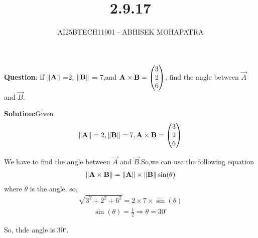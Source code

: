 \documentclass{beamer}
\title{2.9.17}
\author{AI25BTECH11001 - ABHISEK MOHAPATRA}
\numberwithin{equation}{section}
\begin{document}
{\let\newpage\relax\maketitle}
\renewcommand{\thefigure}{\theenumi}
\renewcommand{\thetable}{\theenumi}



	 	\textbf{Question}:
		If $\left\lVert\mathbf{A}\right\rVert$ =2, $\left\lVert\mathbf{B}\right\rVert$ = 7,and $\mathbf{A}\times\mathbf{B} = \begin{pmatrix}3\\2\\6\end{pmatrix}$, find the angle between $\vec{A}$ and $\vec{B}$.


		\textbf{Solution:}Given 
		\begin{align}
				\left\lVert\mathbf{A}\right\rVert =2, \left\lVert\mathbf{B}\right\rVert = 7, \mathbf{A}\times\mathbf{B} = \begin{pmatrix}3\\2\\6\end{pmatrix}
		\end{align}
		
		We have to find the angle between $\vec{A}$ and $\vec{B}$.So,we can use the following equation
		\begin{align}
				\left\lVert\mathbf{A}\times\mathbf{B}\right\rVert = \left\lVert\mathbf{A}\right\rVert\times\left\lVert\mathbf{B}\right\rVert\sin(\theta)
		\end{align}
		where $\theta$ is the angle.
		so,
		\begin{align}
			\sqrt{3^2+2^2+6^2} = 2 \times 7 \times \sin(\theta)	
		\end{align}
		\begin{align}
			\sin(\theta) = \frac{1}{2} \Rightarrow \theta = 30^\circ  
		\end{align}

		So, thde angle is 30$^\circ$.
	
\end{document}
